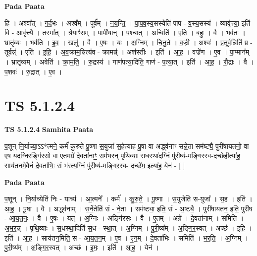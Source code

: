 \documentclass[17pt]{extarticle}
\begin{document}
\textbf{Pada Paata} \newline

हि । अश्वा᳚त् । ग॒र्द॒भः । अश्व᳚म् । पूर्व᳚म् । न॒य॒न्ति॒ । पा॒प॒व॒स्य॒सस्येति॑ पाप - व॒स्य॒सस्य॑ । व्यावृ॑त्त्या॒ इति॑ वि - आवृ॑त्त्यै । तस्मा᳚त् । श्रेयाꣳ॑सम् । पापी॑यान् । प॒श्चात् । अन्विति॑ । ए॒ति॒ । ब॒हुः । वै । भव॑तः । भ्रातृ॑व्यः । भव॑ति । इ॒व॒ । खलु॑ । वै । ए॒षः । यः । अ॒ग्निम् । चि॒नु॒ते । व॒ज्री । अश्वः॑ । प्र॒तूर्व॒न्निति॑ प्र - तूर्वन्न्॑ । एति॑ । इ॒हि॒ । अ॒व॒क्राम॒न्नित्य॑व - क्रामन्न्॑ । अश॑स्तीः । इति॑ । आ॒ह॒ । वज्रे॑ण । ए॒व । पा॒प्मान᳚म् । भ्रातृ॑व्यम् । अवेति॑ । क्रा॒म॒ति॒ । रु॒द्रस्य॑ । गाण॑पत्या॒दिति॒ गाण॑ - प॒त्या॒त् । इति॑ । आ॒ह॒ । रौ॒द्राः । वै । प॒शवः॑ । रु॒द्रात् । ए॒व ।  \newline





\section{ TS 5.1.2.4 }

\textbf{TS 5.1.2.4 } \newline
\textbf{Samhita Paata} \newline

प॒शून् नि॒र्याच्या॒ऽऽ*त्मने॒ कर्म॑ कुरुते पू॒ष्णा स॒युजा॑ स॒हेत्या॑ह पू॒षा वा अद्ध्व॑नाꣳ सन्ने॒ता सम॑ष्ट्यै॒ पुरी॑षायतनो॒ वा ए॒ष यद॒ग्निरङ्गि॑रसो॒ वा ए॒तमग्रे॑ दे॒वता॑नाꣳ॒॒ सम॑भरन् पृथि॒व्याः स॒धस्था॑द॒ग्निं पु॑री॒ष्य॑-मङ्गिर॒स्व-दच्छे॒हीत्या॑ह॒ साय॑तनमे॒वैनं॑ दे॒वता॑भिः॒ सं भ॑रत्य॒ग्निं पु॑री॒ष्य॑-मङ्गिर॒स्व- दच्छे॑म॒ इत्या॑ह॒ येन॑ - [  ] \newline

\textbf{Pada Paata} \newline

प॒शून् । नि॒र्याच्येति॑ निः - याच्य॑ । आ॒त्मने᳚ । कर्म॑ । कु॒रु॒ते॒ । पू॒ष्णा । स॒युजेति॑ स-युजा᳚ । स॒ह । इति॑ । आ॒ह॒ । पू॒षा । वै । अद्ध्व॑नाम् । स॒नें॒तेति॑ सं - ने॒ता । सम॑ष्ट्या॒ इति॒ सं - अ॒ष्ट्यै॒ । पुरी॑षायतन॒ इति॒ पुरी॑ष - आ॒य॒त॒नः॒ । वै । ए॒षः । यत् । अ॒ग्निः । अङ्गि॑रसः । वै । ए॒तम् । अग्रे᳚ । दे॒वता॑नाम् । समिति॑ । अ॒भ॒र॒न्न् । पृ॒थि॒व्याः । स॒धस्था॒दिति॑ स॒ध - स्था॒त् । अ॒ग्निम् । पु॒री॒ष्य᳚म् । अ॒ङ्गि॒र॒स्वत् । अच्छ॑ । इ॒हि॒ । इति॑ । आ॒ह॒ । साय॑तन॒मिति॒ स - आ॒य॒त॒न॒म् । ए॒व । ए॒न॒म् । दे॒वता॑भिः । समिति॑ । भ॒र॒ति॒ । अ॒ग्निम् । पु॒री॒ष्य᳚म् । अ॒ङ्गि॒र॒स्वत् । अच्छ॑ । इ॒मः॒ । इति॑ । आ॒ह॒ । येन॑ ।  \newline
\end{document}
